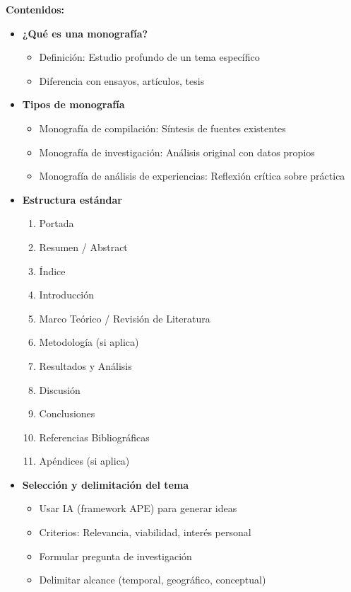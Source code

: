 \documentclass[12pt,a4paper]{yaac-luatex}
\begin{document}
\begin{tcolorbox}[
		enhanced,
		colback=white,
		colframe=curso3color,
		arc=3pt,
		boxrule=1.5pt,
		left=10pt,
		right=10pt,
		top=8pt,
		bottom=8pt,
		breakable
		]
		\textbf{Contenidos:}
		\begin{itemize}[leftmargin=*, itemsep=0.1cm]
			\item \textbf{¿Qué es una monografía?}
			\begin{itemize}
				\item Definición: Estudio profundo de un tema específico
				\item Diferencia con ensayos, artículos, tesis
			\end{itemize}
			\item \textbf{Tipos de monografía}
			\begin{itemize}
				\item Monografía de compilación: Síntesis de fuentes existentes
				\item Monografía de investigación: Análisis original con datos propios
				\item Monografía de análisis de experiencias: Reflexión crítica sobre práctica
			\end{itemize}
			\item \textbf{Estructura estándar}
			\begin{enumerate}[leftmargin=*, itemsep=0.1cm]
				\item Portada
				\item Resumen / Abstract
				\item Índice
				\item Introducción
				\item Marco Teórico / Revisión de Literatura
				\item Metodología (si aplica)
				\item Resultados y Análisis
				\item Discusión
				\item Conclusiones
				\item Referencias Bibliográficas
				\item Apéndices (si aplica)
			\end{enumerate}
			\item \textbf{Selección y delimitación del tema}
			\begin{itemize}
				\item Usar IA (framework APE) para generar ideas
				\item Criterios: Relevancia, viabilidad, interés personal
				\item Formular pregunta de investigación
				\item Delimitar alcance (temporal, geográfico, conceptual)
			\end{itemize}
		\end{itemize}
		

\end{tcolorbox}
\end{document}
